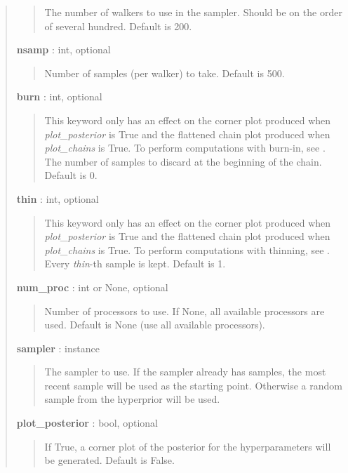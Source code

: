 \documentclass[letterpaper,10pt,english]{sphinxmanual}
\begin{document}
\begin{fulllineitems}
\begin{fulllineitems}
\begin{quote}
\begin{description}
\begin{quote}
The number of walkers to use in the sampler. Should be on the order
of several hundred. Default is 200.
\end{quote}

\textbf{nsamp} : int, optional
\begin{quote}

Number of samples (per walker) to take. Default is 500.
\end{quote}

\textbf{burn} : int, optional
\begin{quote}

This keyword only has an effect on the corner plot produced when
\emph{plot\_posterior} is True and the flattened chain plot produced
when \emph{plot\_chains} is True. To perform computations with burn-in,
see {\hyperref[gptools:gptools.gaussian_process.GaussianProcess.compute_from_MCMC]{}}. The number of samples to discard
at the beginning of the chain. Default is 0.
\end{quote}

\textbf{thin} : int, optional
\begin{quote}

This keyword only has an effect on the corner plot produced when
\emph{plot\_posterior} is True and the flattened chain plot produced
when \emph{plot\_chains} is True. To perform computations with thinning,
see {\hyperref[gptools:gptools.gaussian_process.GaussianProcess.compute_from_MCMC]{}}. Every \emph{thin}-th sample is kept.
Default is 1.
\end{quote}

\textbf{num\_proc} : int or None, optional
\begin{quote}

Number of processors to use. If None, all available processors are
used. Default is None (use all available processors).
\end{quote}

\textbf{sampler} :  instance
\begin{quote}

The sampler to use. If the sampler already has samples, the most
recent sample will be used as the starting point. Otherwise a
random sample from the hyperprior will be used.
\end{quote}

\textbf{plot\_posterior} : bool, optional
\begin{quote}

If True, a corner plot of the posterior for the hyperparameters
will be generated. Default is False.
\end{quote}


\end{description}
\end{quote}
\end{fulllineitems}
\end{fulllineitems}
\end{document}
